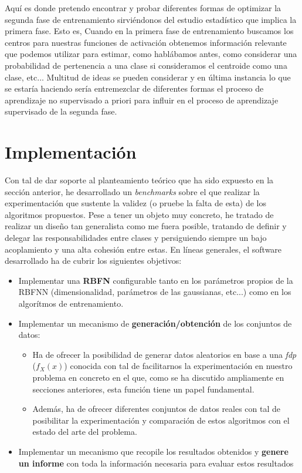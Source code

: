 \documentclass[10pt,a4paper]{report}
\begin{document}
Aquí es donde pretendo encontrar y probar diferentes formas de optimizar la segunda fase de entrenamiento sirviéndonos del estudio estadístico que implica la primera fase. Esto es, Cuando en la primera fase de entrenamiento buscamos los centros para nuestras funciones de activación obtenemos información relevante que podemos utilizar para estimar, como hablábamos antes, como considerar una probabilidad de pertenencia a una clase si consideramos el centroide como una clase, etc... Multitud de ideas se pueden considerar y en última instancia lo que se estaría haciendo sería entremezclar de diferentes formas el proceso de aprendizaje no supervisado a priori para influir en el proceso de aprendizaje supervisado de la segunda fase.


\chapter{Implementación}
Con tal de dar soporte al planteamiento teórico que ha sido expuesto en la sección anterior, he desarrollado un \textit{benchmarks} sobre el que realizar la experimentación que sustente la validez (o pruebe la falta de esta) de los algoritmos propuestos. Pese a tener un objeto muy concreto, he tratado de realizar un diseño tan generalista como me fuera posible, tratando de definir y delegar las responsabilidades entre clases y persiguiendo siempre un bajo acoplamiento y una alta cohesión entre estas.
En líneas generales, el software desarrollado ha de cubrir los siguientes objetivos:
\begin{itemize}
	\item Implementar una \textbf{RBFN} configurable tanto en los parámetros propios de la RBFNN (dimensionalidad, parámetros de las gaussianas, etc...) como en los algorítmos de entrenamiento.
	\item Implementar un mecanismo de \textbf{generación/obtención} de los conjuntos de datos:
	\begin{itemize}
		\item Ha de ofrecer la posibilidad de generar datos aleatorios en base a una \textit{fdp} ($f_X(x)$) conocida con tal de facilitarnos la experimentación en nuestro problema en concreto en el que, como se ha discutido ampliamente en secciones anteriores, esta función tiene un papel fundamental.
		\item Además, ha de ofrecer diferentes conjuntos de datos reales con tal de posibilitar la experimentación y comparación de estos algoritmos con el estado del arte del problema.
	\end{itemize}
	\item Implementar un mecanismo que recopile los resultados obtenidos y \textbf{genere un informe} con toda la información necesaria para evaluar estos resultados
\end{itemize}
\end{document}
